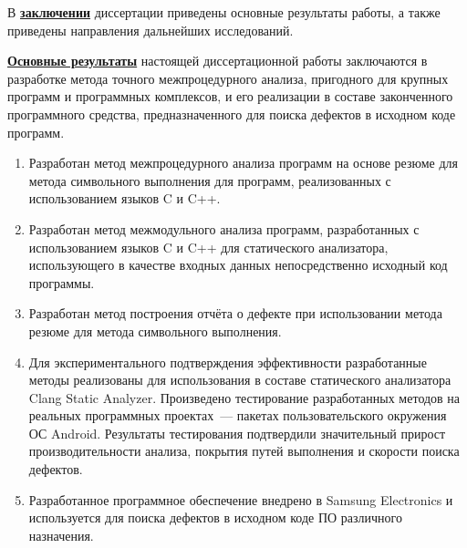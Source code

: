 В \underline{\textbf{заключении}} диссертации приведены основные результаты работы, а также приведены направления дальнейших исследований.%

\underline{\textbf{Основные результаты}} настоящей диссертационной работы заключаются в разработке метода точного межпроцедурного анализа, пригодного для крупных программ и программных комплексов, и его реализации в составе законченного программного средства, предназначенного для поиска дефектов в исходном коде программ.
\begin{enumerate}
  \item Разработан метод межпроцедурного анализа программ на основе резюме для метода символьного выполнения для программ, реализованных с использованием языков C и C++.
  \item Разработан метод межмодульного анализа программ, разработанных с использованием языков C и C++ для статического анализатора, использующего в качестве входных данных непосредственно исходный код программы.
  \item Разработан метод построения отчёта о дефекте при использовании метода резюме для метода символьного выполнения.
  \item Для экспериментального подтверждения эффективности разработанные методы реализованы для использования в составе статического анализатора Clang Static Analyzer. Произведено тестирование разработанных методов на реальных программных проектах~--- пакетах пользовательского окружения ОС Android. Результаты тестирования подтвердили значительный прирост производительности анализа, покрытия путей выполнения и скорости поиска дефектов.
  \item Разработанное программное обеспечение внедрено в Samsung Electronics и используется для поиска дефектов в исходном коде ПО различного назначения.
\end{enumerate}


\renewcommand{\refname}{\large Публикации автора по теме диссертации}
\insertbiblioauthor                          %
